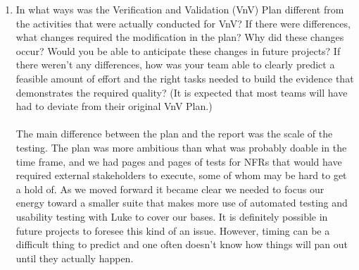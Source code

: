 \documentclass[12pt, titlepage]{article}
\begin{document}
\begin{enumerate}
  \item In what ways was the Verification and Validation (VnV) Plan different
  from the activities that were actually conducted for VnV?  If there were
  differences, what changes required the modification in the plan?  Why did
  these changes occur?  Would you be able to anticipate these changes in future
  projects?  If there weren't any differences, how was your team able to clearly
  predict a feasible amount of effort and the right tasks needed to build the
  evidence that demonstrates the required quality?  (It is expected that most
  teams will have had to deviate from their original VnV Plan.)\\
\\The main difference between the plan and the report was the scale of the testing. The plan was more ambitious than what was probably doable in the time frame, and we had pages and pages of tests for NFRs that would have required external stakeholders to execute, some of whom may be hard to get a hold of. As we moved forward it became clear we needed to focus our energy toward a smaller suite that makes more use of automated testing and usability testing with Luke to cover our bases. It is definitely possible in future projects to foresee this kind of an issue. However, timing can be a difficult thing to predict and one often doesn't know how things will pan out until they actually happen.
\end{enumerate}
\end{document}
